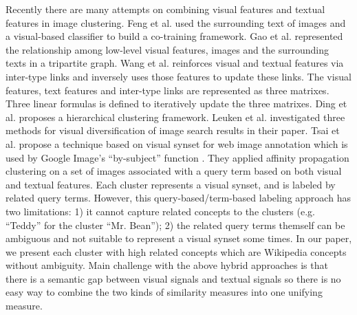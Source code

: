 Recently there are many attempts on combining visual features and textual features in
image clustering. Feng et al. \cite{Feng2004} used the surrounding text of images
and a visual-based classifier to build a co-training framework.
Gao et al.\cite{Gao2005} represented the relationship among low-level visual features,
images and the surrounding texts in a tripartite graph. Wang et al.\cite{WangMZL05}
reinforces visual and textual features via inter-type links and inversely uses those
features to update these links. The visual features, text features and inter-type
links are represented as three matrixes. Three linear formulas is defined to iteratively
update the three matrixes. Ding et al. \cite{DingLL08} proposes a
hierarchical clustering framework.
Leuken et al.\cite{LeukenPOZ09} investigated three methods for
visual diversification of
image search results in their paper.
Tsai et al.\cite{Tsai11} propose a technique based on visual synset
for web image annotation which is used by Google Image's
``by-subject'' function \cite{googleimagesubject,jing2012google}.
They applied affinity propagation clustering on a set of images associated
with a query term based on both visual and textual features.
Each cluster represents a visual synset,
and is labeled by related query terms.
However, this query-based/term-based labeling approach has
two limitations: 1) it cannot capture related concepts
to the clusters (e.g. ``Teddy'' for the cluster ``Mr. Bean'');
2) the related query terms themself can be ambiguous and not suitable to
represent a visual synset some times.
In our paper, we present each cluster with high related concepts which are
Wikipedia concepts without ambiguity.
Main challenge with the above hybrid approaches is that there is a
semantic gap between visual signals and textual signals so there is no easy way
to combine the two kinds of similarity measures into one unifying measure.


